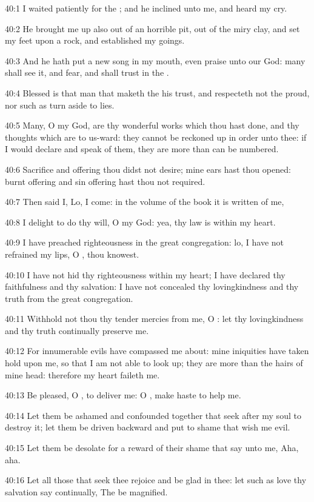 40:1 I waited patiently for the \LORD; and he inclined unto me, and
heard my cry.

40:2 He brought me up also out of an horrible pit, out of the miry
clay, and set my feet upon a rock, and established my goings.

40:3 And he hath put a new song in my mouth, even praise unto our God:
many shall see it, and fear, and shall trust in the \LORD.

40:4 Blessed is that man that maketh the \LORD his trust, and
respecteth not the proud, nor such as turn aside to lies.

40:5 Many, O \LORD my God, are thy wonderful works which thou hast
done, and thy thoughts which are to us-ward: they cannot be reckoned
up in order unto thee: if I would declare and speak of them, they are
more than can be numbered.

40:6 Sacrifice and offering thou didst not desire; mine ears hast thou
opened: burnt offering and sin offering hast thou not required.

40:7 Then said I, Lo, I come: in the volume of the book it is written
of me,

40:8 I delight to do thy will, O my God: yea, thy law is within my
heart.

40:9 I have preached righteousness in the great congregation: lo, I
have not refrained my lips, O \LORD, thou knowest.

40:10 I have not hid thy righteousness within my heart; I have
declared thy faithfulness and thy salvation: I have not concealed thy
lovingkindness and thy truth from the great congregation.

40:11 Withhold not thou thy tender mercies from me, O \LORD: let thy
lovingkindness and thy truth continually preserve me.

40:12 For innumerable evils have compassed me about: mine iniquities
have taken hold upon me, so that I am not able to look up; they are
more than the hairs of mine head: therefore my heart faileth me.

40:13 Be pleased, O \LORD, to deliver me: O \LORD, make haste to help
me.

40:14 Let them be ashamed and confounded together that seek after my
soul to destroy it; let them be driven backward and put to shame that
wish me evil.

40:15 Let them be desolate for a reward of their shame that say unto
me, Aha, aha.

40:16 Let all those that seek thee rejoice and be glad in thee: let
such as love thy salvation say continually, The \LORD be magnified.

